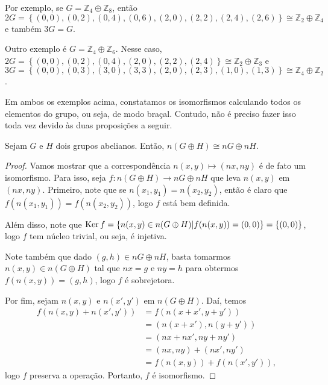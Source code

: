     	\par\vspace{0.3cm} Por exemplo, se $G = \mathbb{Z}_4\oplus\mathbb{Z}_8$, então 
    	$2G = \left\{ (0,0), (0,2), (0,4), (0,6), (2,0), (2,2), (2,4), (2, 6) \right\}
    	\cong \mathbb{Z}_2\oplus\mathbb{Z}_4$ e também $3G=G$. 
    	
    	\par\vspace{0.3cm} Outro exemplo é $G = \mathbb{Z}_4\oplus\mathbb{Z}_6$. Nesse caso, 
    	$2G = \left\{ (0,0), (0,2), (0,4), (2,0), (2,2), (2,4) \right\}
    	\cong \mathbb{Z}_2\oplus\mathbb{Z}_3$ e 
    	$3G = \left\{ (0,0), (0,3), (3,0), (3,3), (2,0), (2,3), (1,0), (1,3) \right\}
    	\cong \mathbb{Z}_4\oplus\mathbb{Z}_2$. 
    	
    	\par\vspace{0.3cm} Em ambos os exemplos acima, constatamos os isomorfismos calculando todos os 
    	elementos do grupo, ou seja, de modo braçal. Contudo, não é preciso fazer isso toda vez devido 
    	às duas proposições a seguir.
    	\begin{prop}
    	\label{subgrupo abeliano nG}
    		Sejam $G$ e $H$ dois grupos abelianos. Então, $n(G\oplus H)\cong nG\oplus nH$.
    	\end{prop}
    	\begin{proof}
    		Vamos mostrar que a correspondência $n(x,y)\mapsto(nx,ny)$ é de fato um isomorfismo. 
    		Para isso, seja $f: n(G\oplus H)\to nG\oplus nH$ que leva $n(x,y)$ em $(nx,ny)$. Primeiro, 
    		note que se $n(x_1,y_1) = n(x_2,y_2)$, então é claro que $f(n(x_1,y_1)) = f(n(x_2,y_2))$, 
    		logo $f$ está bem definida.
    		
    		\par\vspace{0.3cm} Além disso, note que 
    		$\operatorname{Ker} f = \left\{ n(x,y)\in n(G\oplus H)\vert f( n(x,y) ) = (0,0) \right\} = \left\{ (0,0) \right\}$,
    		logo $f$ tem núcleo trivial, ou seja, é injetiva.
    		
    		\par\vspace{0.3cm} Note também que dado $(g,h)\in nG\oplus nH$, basta tomarmos 
    		$n(x,y)\in n(G\oplus H)$ tal que $nx = g$ e $ny = h$ para obtermos $f(n(x,y)) = (g,h)$, 
    		logo $f$ é sobrejetora.
    		
    		\par\vspace{0.3cm} Por fim, sejam $n(x,y)$ e $n(x',y')$ em $n(G\oplus H)$. Daí, temos
    		\begin{align*}
    		    f( n(x,y) + n(x',y') ) &= f( n(x+x', y+y') ) \\ 
    		    &= ( n(x+x'), n(y+y') ) \\ 
    		    &= (nx + nx', ny + ny') \\ 
    		    &= (nx, ny) + (nx', ny') \\ 
    		    &= f(n(x,y)) + f(n(x',y')),
    		\end{align*}
    		logo $f$ preserva a operação. Portanto, $f$ é isomorfismo.
    	\end{proof}
